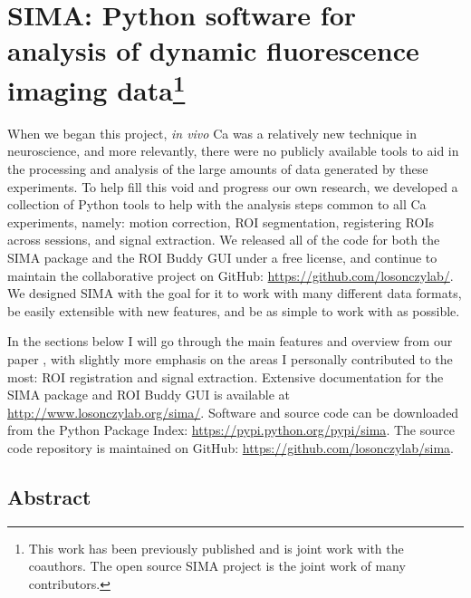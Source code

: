 \acresetall
\chapter[SIMA Analysis Software]{SIMA: Python software for analysis of dynamic fluorescence imaging data\footnote{This work has been previously published \citep{Kaifosh2014} and is joint work with the coauthors. The open source SIMA project is the joint work of many contributors.}}
\label{ch:sima}

When we began this project, \emph{in vivo} Ca was a relatively new technique in neuroscience, and more relevantly, there were no publicly available tools to aid in the processing and analysis of the large amounts of data generated by these experiments.
To help fill this void and progress our own research, we developed a collection of Python tools to help with the analysis steps common to all Ca experiments, namely: motion correction, ROI segmentation, registering ROIs across sessions, and signal extraction.
We released all of the code for both the SIMA package and the ROI Buddy GUI under a free license, and continue to maintain the collaborative project on GitHub: \url{https://github.com/losonczylab/}. 
We designed SIMA with the goal for it to work with many different data formats, be easily extensible with new features, and be as simple to work with as possible.

In the sections below I will go through the main features and overview from our paper \citep{Kaifosh2014}, with slightly more emphasis on the areas I personally contributed to the most: ROI registration and signal extraction.
Extensive documentation for the SIMA package and ROI Buddy GUI
is available at \url{http://www.losonczylab.org/sima/}.
Software and source code can be downloaded from the Python Package Index: 
\url{https://pypi.python.org/pypi/sima}.
The source code repository is maintained on GitHub:
\url{https://github.com/losonczylab/sima}.

\section{Abstract}

